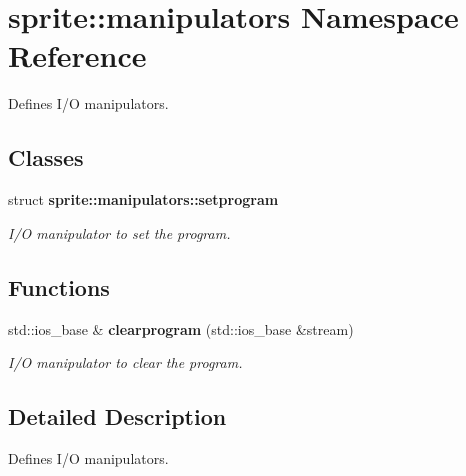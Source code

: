 \section{sprite::manipulators Namespace Reference}
\label{namespacesprite_1_1manipulators}
Defines I/O manipulators.  


\subsection*{Classes}
\begin{CompactItemize}
\item 
struct {\bf sprite::manipulators::setprogram}
\begin{CompactList}\small\item\em I/O manipulator to set the program. \item\end{CompactList}\end{CompactItemize}
\subsection*{Functions}
\begin{CompactItemize}
\item 
std::ios\_\-base \& {\bf clearprogram} (std::ios\_\-base \&stream)\label{namespacesprite_1_1manipulators_a0}

\begin{CompactList}\small\item\em I/O manipulator to clear the program. \item\end{CompactList}\end{CompactItemize}


\subsection{Detailed Description}
Defines I/O manipulators. 
